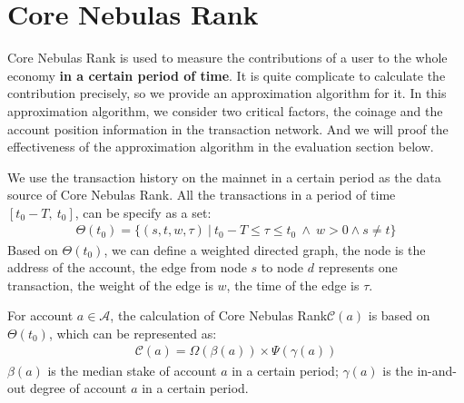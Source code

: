 \section{Core Nebulas Rank}

Core Nebulas Rank is used to measure the contributions of a user to the whole economy {\textbf{in a certain period of time}}.
It is quite complicate to calculate the contribution precisely, so we provide an approximation algorithm for it.
In this approximation algorithm, we consider two critical factors, the coinage and the account position information in the transaction network. And we will proof the effectiveness of the approximation algorithm in the evaluation section below.

We use the transaction history on the mainnet in a certain period as the data source of Core Nebulas Rank.
All the transactions in a period of time $[t_0-T,\ t_0]$, can be specify as a set:
\begin{align}
\Theta(t_0) = \{(s, t, w, \tau)\ |\ t_0 - T \le \tau \le t_0\ \land \ w > 0 \land s \neq t \}
\end{align}
\noindent Based on $\Theta(t_0)$, we can define a weighted directed graph, the node is the address of the account, the edge from node $s$ to node $d$ represents one transaction,
the weight of the edge is $w$, the time of the edge is $\tau$.

For account $a \in \mathcal{A}$, the calculation of Core Nebulas Rank$\mathcal{C}(a)$ is based on $\Theta(t_0)$, which can be represented as:
\begin{align}
\mathcal{C}(a) = \Omega(\beta(a)) \times{} \Psi(\gamma(a))
\label{eq:rank}
\end{align}
\noindent $\beta(a)$ is the median stake of account $a$ in a certain period; $\gamma(a)$ is the in-and-out degree of account $a$ in a certain period.



